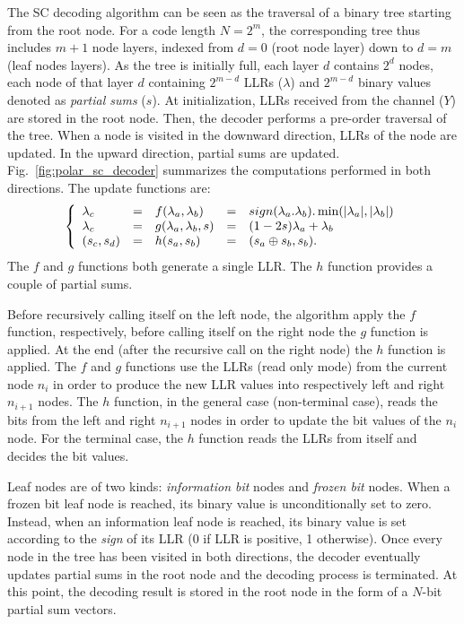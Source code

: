 The SC decoding algorithm can be seen as the traversal of a binary tree starting
from the root node. For a code length $N=2^m$, the corresponding tree thus
includes $m + 1$ node layers, indexed from $d=0$ (root node layer) down to
$d=m$ (leaf nodes layers). As the tree is initially full, each layer $d$
contains $2^d$ nodes, each node of that layer $d$  containing $2^{m-d}$ LLRs
($\lambda$) and $2^{m-d}$ binary values denoted as \textit{partial sums} ($s$).
At initialization, LLRs received  from the channel ($Y$) are stored in the root
node. Then, the decoder performs a pre-order traversal of the tree. When a node
is visited in the downward direction, LLRs of the node are updated. In the
upward direction, partial sums are updated. Fig.~\ref{fig:polar_sc_decoder}
summarizes the computations performed in both directions. The update functions
are:
\begin{eqnarray}
\left\{\begin{array}{l c l c l}
\lambda_c &=& f(\lambda_a,\lambda_b) &=& sign(\lambda_a.\lambda_b).\min(|\lambda_a|,|\lambda_b|)\\
\lambda_c &=& g(\lambda_a,\lambda_b,s)&=&(1-2s)\lambda_a+\lambda_b\\
(s_{c}, s_{d}) &=& h(s_{a}, s_{b}) &=& (s_{a} \oplus s_{b}, s_{b}).
\end{array}\right.
\label{eq:polar_f_g_h}
\end{eqnarray}
The $f$ and $g$ functions both generate a single LLR. The $h$ function provides
a couple of partial sums.

Before recursively calling itself on the left node, the algorithm apply the $f$
function, respectively, before calling itself on the right node the $g$ function
is applied. At the end (after the recursive call on the right node) the $h$
function is applied. The $f$ and $g$ functions use the LLRs (read only mode)
from the current node $n_i$ in order to produce the new LLR values into
respectively left and right $n_{i+1}$ nodes. The $h$ function, in the general
case (non-terminal case), reads the bits from the left and right $n_{i+1}$ nodes
in order to update the bit values of the $n_i$ node. For the terminal case, the
$h$ function reads the LLRs from itself and decides the bit values.

Leaf nodes are of two kinds: \emph{information bit} nodes and \emph{frozen bit}
nodes. When a frozen bit leaf node is reached, its binary value is
unconditionally set to zero. Instead, when an information leaf node is reached,
its binary value is set according to the \emph{sign} of its LLR (0 if LLR is
positive, 1 otherwise). Once every node in the tree has been visited in both
directions, the decoder eventually updates partial sums in the root node and the
decoding process is terminated. At this point, the decoding result is stored in
the root node in the form of a $N$-bit partial sum vectors.

